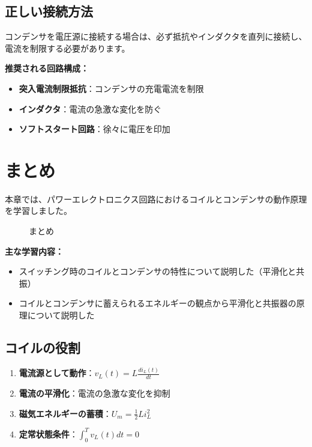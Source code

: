 \subsection{正しい接続方法}

コンデンサを電圧源に接続する場合は、必ず抵抗やインダクタを直列に接続し、電流を制限する必要があります。

\textbf{推奨される回路構成：}

\begin{itemize}
\item \textbf{突入電流制限抵抗}：コンデンサの充電電流を制限
\item \textbf{インダクタ}：電流の急激な変化を防ぐ
\item \textbf{ソフトスタート回路}：徐々に電圧を印加
\end{itemize}

\section{まとめ}

本章では、パワーエレクトロニクス回路におけるコイルとコンデンサの動作原理を学習しました。

\begin{figure}[H]
\centering
{}
\caption{まとめ}
\label{fig:ch04_summary}
\end{figure}

\textbf{主な学習内容：}

\begin{itemize}
\item スイッチング時のコイルとコンデンサの特性について説明した（平滑化と共振）
\item コイルとコンデンサに蓄えられるエネルギーの観点から平滑化と共振器の原理について説明した
\end{itemize}

\subsection{コイルの役割}

\begin{enumerate}
\item \textbf{電流源として動作}：$v_L(t) = L \frac{di_L(t)}{dt}$
\item \textbf{電流の平滑化}：電流の急激な変化を抑制
\item \textbf{磁気エネルギーの蓄積}：$U_m = \frac{1}{2}Li_L^2$
\item \textbf{定常状態条件}：$\int_0^T v_L(t)dt = 0$
\end{enumerate}

